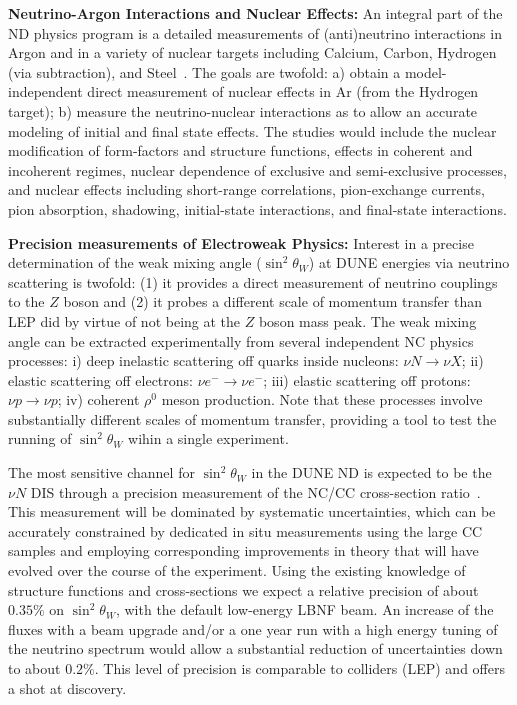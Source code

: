 \vspace{0.25cm} 
\noindent 
{\bf Neutrino-Argon Interactions and Nuclear Effects:} 
An integral part of the ND physics program is a  detailed measurements of (anti)neutrino 
interactions in Argon and in a variety of nuclear targets including Calcium, Carbon, Hydrogen (via subtraction), 
and Steel~\cite{ND-NUCL}. 
The goals are twofold: a) obtain a model-independent direct measurement of nuclear effects in Ar (from 
the Hydrogen target); b) measure the neutrino-nuclear interactions as to allow an accurate modeling 
of initial and final state effects. The studies would include 
the nuclear modification of form-factors and structure functions, effects in coherent and incoherent 
regimes, nuclear dependence of exclusive and semi-exclusive processes, and nuclear 
effects including short-range correlations, pion-exchange currents, pion absorption, shadowing, 
initial-state interactions, and final-state interactions. 

\vspace{0.25cm} 
\noindent 
{\bf Precision measurements of  Electroweak Physics:} 
Interest in a precise determination of the weak mixing angle ($\sin^2 \theta_W$) at DUNE 
energies via neutrino scattering is twofold: (1) it provides a direct measurement of neutrino couplings to 
the $Z$ boson and (2) it probes a different scale of momentum transfer than LEP did by virtue
of not being at the $Z$ boson mass peak. 
% 
The weak mixing angle can be extracted experimentally from several independent NC physics processes:
i) deep inelastic scattering off quarks inside nucleons: $\nu N \to \nu X$; ii) elastic scattering off electrons: $\nu e^- \to \nu e^-$; 
iii) elastic scattering off protons: $\nu p \to \nu p$; iv) coherent $\rho^0$ meson production. 
Note that these processes involve
substantially different scales of momentum transfer, providing a tool
to test the running of $\sin^2 \theta_W$ wihin a single experiment. 

The most sensitive channel for $\sin^2 \theta_W$ 
in the DUNE ND is expected to be the $\nu N$ DIS through a precision measurement 
of the NC/CC cross-section ratio~\cite{ND-EW}. This measurement will be dominated by systematic uncertainties, which can be 
accurately constrained by dedicated in situ measurements using the large CC samples and employing corresponding 
improvements in theory that will have evolved over the course of the experiment. Using the existing knowledge of 
structure functions and cross-sections we expect a relative precision of about $0.35\%$ on $\sin^2 \theta_W$, with 
the default low-energy LBNF beam. An increase of the fluxes with a beam upgrade and/or a one year run with a high 
energy tuning of the neutrino spectrum would allow a substantial reduction of uncertainties down to about $0.2\%$. 
This level of precision is comparable to colliders (LEP) and offers a shot at discovery. 

